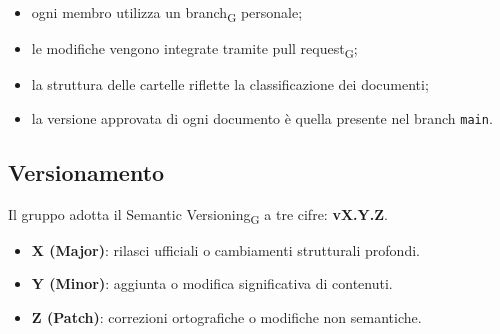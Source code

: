 \begin{itemize}
    \item ogni membro utilizza un branch\textsubscript{G} personale;
    \item le modifiche vengono integrate tramite pull request\textsubscript{G};
    \item la struttura delle cartelle riflette la classificazione dei documenti;
    \item la versione approvata di ogni documento è quella presente nel branch \texttt{main}.
\end{itemize}

\subsection{Versionamento}

Il gruppo adotta il Semantic Versioning\textsubscript{G} a tre cifre: \textbf{vX.Y.Z}.

\begin{itemize}
    \item \textbf{X (Major)}: rilasci ufficiali o cambiamenti strutturali profondi.
    \item \textbf{Y (Minor)}: aggiunta o modifica significativa di contenuti.
    \item \textbf{Z (Patch)}: correzioni ortografiche o modifiche non semantiche.
\end{itemize}

